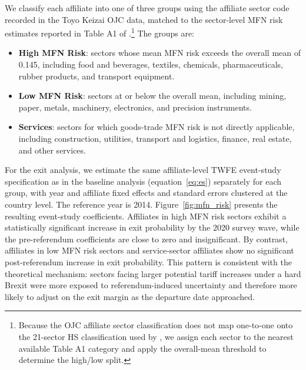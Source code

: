 \documentclass[preprint,11pt,authoryear]{elsarticle}
\begin{document}
We classify each affiliate into one of three groups using the affiliate sector code recorded in the Toyo Keizai OJC data, matched to the sector-level MFN risk estimates reported in Table A1 of \citet{graziano2021brexit}.\footnote{Because the OJC affiliate sector classification does not map one-to-one onto the 21-sector HS classification used by \citet{graziano2021brexit}, we assign each sector to the nearest available Table A1 category and apply the overall-mean threshold to determine the high/low split.} The groups are:
\begin{itemize}
  \item \textbf{High MFN Risk}: sectors whose mean MFN risk exceeds the overall mean of 0.145, including food and beverages, textiles, chemicals, pharmaceuticals, rubber products, and transport equipment.
  \item \textbf{Low MFN Risk}: sectors at or below the overall mean, including mining, paper, metals, machinery, electronics, and precision instruments.
  \item \textbf{Services}: sectors for which goods-trade MFN risk is not directly applicable, including construction, utilities, transport and logistics, finance, real estate, and other services.
\end{itemize}

For the exit analysis, we estimate the same affiliate-level TWFE event-study specification as in the baseline analysis (equation~\ref{eq:es}) separately for each group, with year and affiliate fixed effects and standard errors clustered at the country level. The reference year is 2014. Figure~\ref{fig:mfn_risk} presents the resulting event-study coefficients. Affiliates in high MFN risk sectors exhibit a statistically significant increase in exit probability by the 2020 survey wave, while the pre-referendum coefficients are close to zero and insignificant. By contrast, affiliates in low MFN risk sectors and service-sector affiliates show no significant post-referendum increase in exit probability. This pattern is consistent with the theoretical mechanism: sectors facing larger potential tariff increases under a hard Brexit were more exposed to referendum-induced uncertainty and therefore more likely to adjust on the exit margin as the departure date approached.
\end{document}
